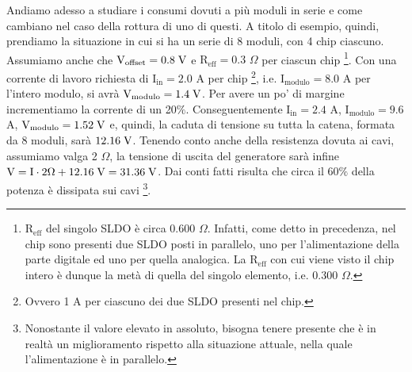 Andiamo adesso a studiare i consumi dovuti a più moduli in serie e come cambiano nel caso della rottura di uno di questi.
A titolo di esempio, quindi, prendiamo la situazione in cui si ha un serie di 8 moduli, con 4 chip ciascuno.
Assumiamo anche che $\mathrm{V_{offset}=0.8} \rm \; V$ e $\mathrm{R_{eff}=0.3}$ $\Omega$ per ciascun chip
\footnote{
  $\mathrm{R_{eff}}$ del singolo SLDO è circa 0.600 $\Omega$.
  Infatti, come detto in precedenza, nel chip sono presenti due SLDO posti in parallelo, uno per l'alimentazione della parte digitale ed uno per quella analogica.
  La $\mathrm{R_{eff}}$ con cui viene visto il chip intero è dunque la metà di quella del singolo elemento, i.e. 0.300 $\Omega$.
}.
Con una corrente di lavoro richiesta di $\mathrm{I_{in}=2.0}$ A per chip
\footnote{
  Ovvero 1 A per ciascuno dei due SLDO presenti nel chip.
},
i.e. $\mathrm{I_{modulo}=8.0}$ A per l'intero modulo, si avrà $\mathrm{V_{modulo}=1.4} \rm \; V$.
Per avere un po' di margine incrementiamo la corrente di un 20$\%$.
Conseguentemente $\mathrm{I_{in}=2.4}$ A, $\mathrm{I_{modulo}=9.6}$ A, $\mathrm{V_{modulo}=1.52} \rm \; V$ e, quindi, la caduta di tensione su tutta la catena, formata da 8 moduli, sarà $12.16 \rm \; V$.
Tenendo conto anche della resistenza dovuta ai cavi, assumiamo valga 2 $\Omega$, la tensione di uscita del generatore sarà infine $\mathrm{V=I \cdot 2 \Omega +12.16 \rm \; V=31.36 \rm \; V}$.
  Dai conti fatti risulta che circa il $60 \%$ della potenza è dissipata sui cavi
\footnote{
  Nonostante il valore elevato in assoluto, bisogna tenere presente che è in realtà un miglioramento rispetto alla situazione attuale, nella quale l'alimentazione è in parallelo.
}. %

